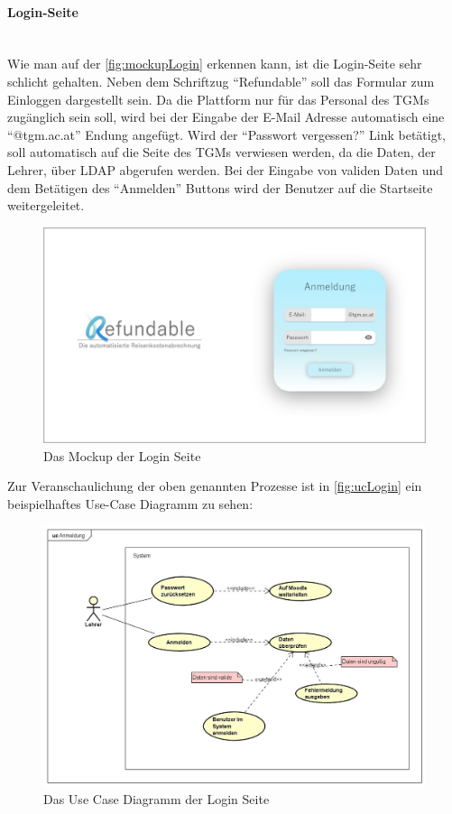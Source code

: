\paragraph{Login-Seite}
~\\
Wie man auf der \autoref{fig:mockupLogin} erkennen kann, ist die Login-Seite sehr schlicht gehalten. Neben dem Schriftzug \enquote{Refundable} soll das Formular zum Einloggen dargestellt sein. Da die Plattform nur für das Personal des TGMs zugänglich sein soll, wird bei der Eingabe der E-Mail Adresse automatisch eine \enquote{@tgm.ac.at} Endung angefügt. Wird der \enquote{Passwort vergessen?} Link betätigt, soll automatisch auf die Seite des TGMs verwiesen werden, da die Daten, der Lehrer, über LDAP abgerufen werden. Bei der Eingabe von validen Daten und dem Betätigen des \enquote{Anmelden} Buttons wird der Benutzer auf die Startseite weitergeleitet.
\begin{figure}[H]
	\centering
	\includegraphics[width=1\linewidth]{images/ldehner_konzept/Mockup-Startseite}
	\caption[Mockup Login]{Das Mockup der Login Seite}
	\label{fig:mockupLogin}
\end{figure}
Zur Veranschaulichung der oben genannten Prozesse ist in \autoref{fig:ucLogin} ein beispielhaftes Use-Case Diagramm zu sehen: 
\begin{figure}[H]
	\centering
	\includegraphics[width=1\linewidth]{images/ldehner_konzept/uc-login}
	\caption[Use Case Diagramm Login]{Das Use Case Diagramm der Login Seite}
	\label{fig:ucLogin}
\end{figure}
\newpage
